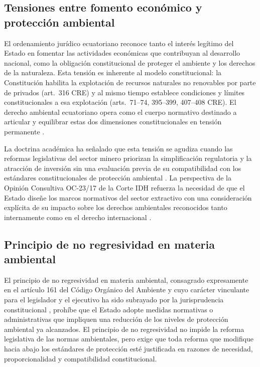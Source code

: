 \subsection{Tensiones entre fomento económico y protección ambiental}

El ordenamiento jurídico ecuatoriano reconoce tanto el interés legítimo del Estado en fomentar las actividades económicas que contribuyan al desarrollo nacional, como la obligación constitucional de proteger el ambiente y los derechos de la naturaleza. Esta tensión es inherente al modelo constitucional: la Constitución habilita la explotación de recursos naturales no renovables por parte de privados (art.\ 316 CRE) y al mismo tiempo establece condiciones y límites constitucionales a esa explotación (arts.\ 71--74, 395--399, 407--408 CRE). El derecho ambiental ecuatoriano opera como el cuerpo normativo destinado a articular y equilibrar estas dos dimensiones constitucionales en tensión permanente \parencite{grefa_valencia_2021}.

La doctrina académica ha señalado que esta tensión se agudiza cuando las reformas legislativas del sector minero priorizan la simplificación regulatoria y la atracción de inversión sin una evaluación previa de su compatibilidad con los estándares constitucionales de protección ambiental \parencite{condoy_viera_2025,peck_et_al_2024}. La perspectiva de la Opinión Consultiva OC-23/17 de la Corte IDH refuerza la necesidad de que el Estado diseñe los marcos normativos del sector extractivo con una consideración explícita de su impacto sobre los derechos ambientales reconocidos tanto internamente como en el derecho internacional \parencite{corte_idh_oc23_2017}.

\subsection{Principio de no regresividad en materia ambiental}

El principio de no regresividad en materia ambiental, consagrado expresamente en el artículo 161 del Código Orgánico del Ambiente \parencite{coa_2017} y cuyo carácter vinculante para el legislador y el ejecutivo ha sido subrayado por la jurisprudencia constitucional \parencite{cce_32_17_in_21}, prohíbe que el Estado adopte medidas normativas o administrativas que impliquen una reducción de los niveles de protección ambiental ya alcanzados. El principio de no regresividad no impide la reforma legislativa de las normas ambientales, pero exige que toda reforma que modifique hacia abajo los estándares de protección esté justificada en razones de necesidad, proporcionalidad y compatibilidad constitucional.


